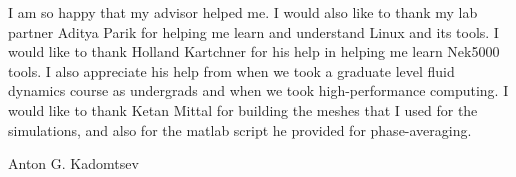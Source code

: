 %
%
%
%
%

\begin{acknowledgments} 
I am so happy that my advisor helped me. I would also like to thank my lab partner Aditya Parik for helping me learn and understand Linux and its tools. I would like to thank Holland Kartchner for his help in helping me learn Nek5000 tools. I also appreciate his help from when we took a graduate level fluid dynamics course as undergrads and when we took high-performance computing. I would like to thank Ketan Mittal for building the meshes that I used for the simulations, and also for the matlab script he provided for phase-averaging. 
\\
\begin{flushright} 
Anton G. Kadomtsev 
\end{flushright}
\end{acknowledgments}

